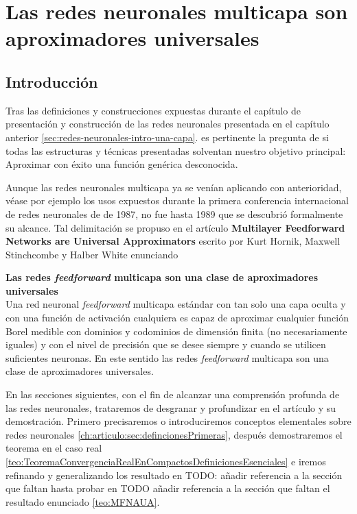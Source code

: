 %

\chapter{Las redes neuronales multicapa son aproximadores universales}  

\section{Introducción}  

Tras las definiciones y construcciones expuestas durante el capítulo de presentación 
y construcción de las redes neuronales  presentada en el capítulo anterior \ref{sec:redes-neuronales-intro-una-capa}.
es pertinente la pregunta de si todas las estructuras y técnicas presentadas solventan nuestro 
objetivo principal: Aproximar con éxito una función genérica desconocida.   

Aunque las redes neuronales multicapa ya se venían aplicando con anterioridad, 
véase por ejemplo los usos expuestos durante la primera conferencia
internacional de redes neuronales de \cite{4307059} de 1987, 
no fue hasta 1989 que se descubrió formalmente su alcance.
 Tal delimitación se propuso en el artículo 
\textbf{Multilayer Feedforward Networks are Universal Approximators} \cite{HORNIK1989359}
 escrito por Kurt Hornik, Maxwell Stinchcombe y Halber White enunciando 

\begin{teorema}\textbf{Las redes \textit{feedforward} multicapa son una clase de aproximadores universales } \label{teo:MFNAUA}
    \\
    Una red neuronal \textit{feedforward} multicapa estándar con tan solo una capa oculta y con una función de activación cualquiera es capaz de aproximar cualquier 
    función Borel medible  con dominios y codominios de dimensión finita (no necesariamente iguales) y con el nivel de precisión que se desee siempre y cuando 
    se utilicen suficientes neuronas. En este sentido las redes \textit{feedforward} multicapa son una clase de aproximadores universales.

\end{teorema}

En las secciones siguientes, con el fin de alcanzar una comprensión profunda de las redes neuronales,
trataremos de desgranar y profundizar en el artículo y su demostración. Primero precisaremos o introduciremos conceptos elementales 
sobre redes neuronales \ref{ch:articulo:sec:defincionesPrimeras}, después demostraremos el teorema en el caso real 
\ref{teo:TeoremaConvergenciaRealEnCompactosDefinicionesEsenciales} e iremos refinando y generalizando los resultado 
en 
TODO: añadir referencia a la sección  que faltan 
hasta probar en 
TODO añadir referencia a la sección  que faltan 
el resultado enunciado \ref{teo:MFNAUA}.


